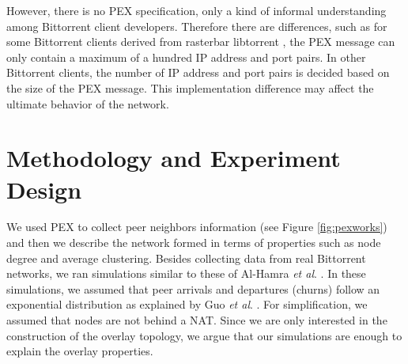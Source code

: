 \documentclass[10pt,conference,letterpaper]{IEEEtran}
\begin{document}
However,  there is no PEX specification, only a kind of informal understanding among Bittorrent client developers.
Therefore there are differences, such as for some Bittorrent clients derived from rasterbar libtorrent \cite{rasterbar}, the PEX message can only contain a maximum of a hundred IP address and port pairs. 
In other Bittorrent clients, the number of IP address and port pairs is decided based on the size of the PEX message.  
This implementation difference may affect the ultimate behavior of the network.

\section{Methodology and Experiment Design}\label{methodanddesign}

We used PEX to collect peer neighbors information  (see Figure \ref{fig:pexworks}) and then we describe the network formed in terms of properties such as node degree and average clustering. 
Besides collecting data from real Bittorrent networks, we ran simulations similar to these of Al-Hamra \textit{et al}. \cite{al2009swarming}. 
In these simulations, we assumed that peer arrivals and departures (churns) follow an exponential distribution as explained by Guo \textit{et al}. \cite{guo2005measurements}. 
For simplification, we assumed that nodes are not behind a NAT.
Since we are only interested in the construction of the overlay topology, we argue that our simulations are enough to explain the overlay properties.
\end{document}
